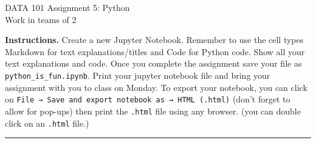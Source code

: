 \documentclass[12pt]{article}
\begin{document}
\vspace*{-0.8cm}
\begin{flushright}
\end{flushright}
\vspace{.16cm}

\begin{center}
{\LARGE DATA 101 Assignment 5: Python}\\[6pt]
\small Work in teams of 2
\end{center}

\bigskip
\noindent
\textbf{Instructions.} Create a new Jupyter Notebook. Remember to use the cell types Markdown for text explanations/titles and Code for Python code. Show all your text explanations and code. Once you complete the assignment save your file as \texttt{python\_is\_fun.ipynb}. Print your jupyter notebook file and bring your assignment with you to class on Monday. To export your notebook, you can click on \texttt{File → Save and export notebook as → HTML (.html)} (don't forget to allow for pop-ups) then print the \texttt{.html} file using any browser. (you can double click on an \texttt{.html} file.)

\bigskip
\hrule
\bigskip
\end{document}
